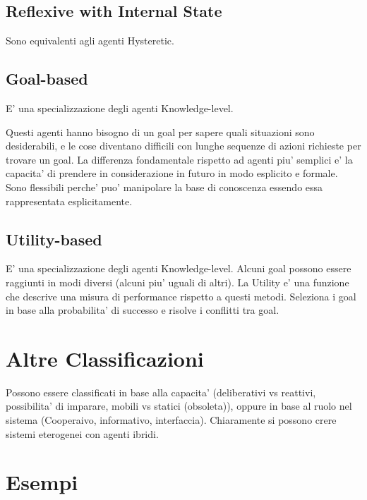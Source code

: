 \subsection{Reflexive with Internal State}

Sono equivalenti agli agenti Hysteretic.


\subsection{Goal-based}

E' una specializzazione degli agenti Knowledge-level.

Questi agenti hanno bisogno di un goal per sapere quali situazioni sono desiderabili, e le cose diventano difficili con lunghe sequenze di azioni richieste per trovare un goal.
La differenza fondamentale rispetto ad agenti piu' semplici e' la capacita' di prendere in considerazione in futuro in modo esplicito e formale.
Sono flessibili perche' puo' manipolare la base di conoscenza essendo essa rappresentata esplicitamente.


\subsection{Utility-based}

E' una specializzazione degli agenti Knowledge-level.
Alcuni goal possono essere raggiunti in modi diversi (alcuni piu' uguali di altri).
La Utility e' una funzione che descrive una misura di performance rispetto a questi metodi.
Seleziona i goal in base alla probabilita' di successo e risolve i conflitti tra goal.


\section{Altre Classificazioni}

Possono essere classificati in base alla capacita' (deliberativi vs reattivi, possibilita' di imparare, mobili vs statici (obsoleta)), oppure in base al ruolo nel sistema (Cooperaivo, informativo, interfaccia).
Chiaramente si possono crere sistemi eterogenei con agenti ibridi.

\section{Esempi}

